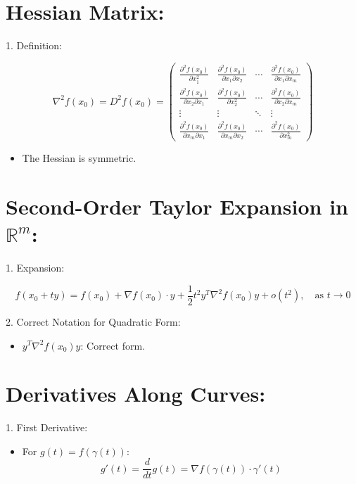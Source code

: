 \documentclass{article}
\begin{document}
\section*{Hessian Matrix:}

1. Definition:

\[
\nabla^2 f(x_0) = D^2 f(x_0) = \begin{pmatrix}
\frac{\partial^2 f(x_0)}{\partial x_1^2} & \frac{\partial^2 f(x_0)}{\partial x_1 \partial x_2} & \cdots & \frac{\partial^2 f(x_0)}{\partial x_1 \partial x_m} \\
\frac{\partial^2 f(x_0)}{\partial x_2 \partial x_1} & \frac{\partial^2 f(x_0)}{\partial x_2^2} & \cdots & \frac{\partial^2 f(x_0)}{\partial x_2 \partial x_m} \\
\vdots & \vdots & \ddots & \vdots \\
\frac{\partial^2 f(x_0)}{\partial x_m \partial x_1} & \frac{\partial^2 f(x_0)}{\partial x_m \partial x_2} & \cdots & \frac{\partial^2 f(x_0)}{\partial x_m^2}
\end{pmatrix}
\]

\begin{itemize}
    \item The Hessian is symmetric.
\end{itemize}

\section*{Second-Order Taylor Expansion in $\mathbb{R}^m$:}

1. Expansion:

\[
f(x_0 + ty) = f(x_0) + \nabla f(x_0) \cdot y + \frac{1}{2} t^2 y^T \nabla^2 f(x_0) y + o(t^2), \quad \text{as } t \to 0
\]

2. Correct Notation for Quadratic Form:
\begin{itemize}
    \item \( y^T \nabla^2 f(x_0) y \): Correct form.
\end{itemize}

\section*{Derivatives Along Curves:}

1. First Derivative:
\begin{itemize}
    \item For \( g(t) = f(\gamma(t)) \):
\[
g'(t) = \frac{d}{dt} g(t) = \nabla f(\gamma(t)) \cdot \gamma'(t)
\]
\end{itemize}
\end{document}
